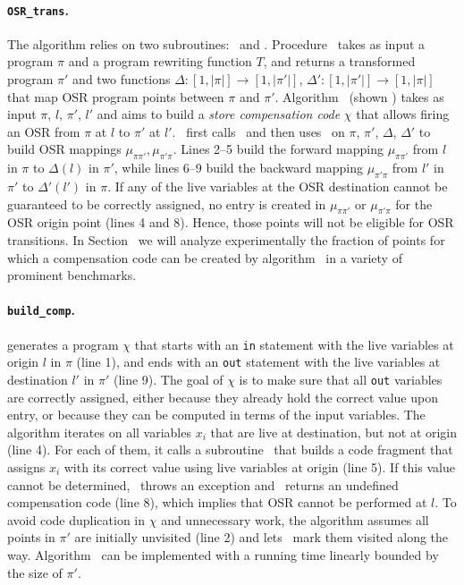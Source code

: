 \paragraph*{\texttt{OSR\_trans}.} The algorithm relies on two subroutines: \apply\ and \buildcomp. Procedure \apply\ takes as input a program $\pi$ and a program rewriting function $T$, and returns a transformed program $\pi'$ and two functions $\Delta:[1,|\pi|]\rightarrow [1,|\pi'|]$, $\Delta':[1,|\pi'|]\rightarrow [1,|\pi|]$ that map OSR program points between $\pi$ and $\pi'$. 
Algorithm \buildcomp\ (shown ) takes as input $\pi$, $l$, $\pi'$, $l'$ and aims to build a {\em store compensation code} $\chi$ that allows firing an OSR from $\pi$ at $l$ to $\pi'$ at $l'$. \osrtrans\ first calls \apply\ and then uses \buildcomp\ on $\pi$, $\pi'$, $\Delta$, $\Delta'$ to build OSR mappings $\mu_{\pi\pi'},\mu_{\pi'\pi}$. Lines 2--5 build the forward mapping $\mu_{\pi\pi'}$ from $l$ in $\pi$ to $\Delta(l)$ in $\pi'$, while lines 6--9 build the backward mapping $\mu_{\pi'\pi}$ from $l'$ in $\pi'$ to $\Delta'(l')$ in $\pi$. If any of the live variables at the OSR destination cannot be guaranteed to be correctly assigned, no entry is created in $\mu_{\pi\pi'}$ or $\mu_{\pi'\pi}$ for the OSR origin point (lines 4 and 8). Hence, those points will not be eligible for OSR transitions. In Section \missing\ we will analyze experimentally the fraction of points for which a compensation code can be created by algorithm \buildcomp\ in a variety of prominent benchmarks.

\paragraph*{\texttt{build\_comp}.}  generates a program $\chi$ that starts with an {\tt in} statement with the live variables at origin $l$ in $\pi$ (line 1), and ends with an {\tt out} statement with the live variables at destination $l'$ in $\pi'$ (line 9). The goal of $\chi$ is to make sure that all {\tt out} variables are correctly assigned, either because they already hold the correct value upon entry, or because they can be computed in terms of the input variables. The algorithm iterates on all variables $x_i$ that are live at destination, but not at origin (line 4). For each of them, it calls a subroutine \reconstruct\ that builds a code fragment that assigns $x_i$ with its correct value using live variables at origin (line 5). If this value cannot be determined, \reconstruct\ throws an exception and \buildcomp\ returns an undefined compensation code (line 8), which implies that OSR cannot be performed at $l$. To avoid code duplication in $\chi$ and unnecessary work, the algorithm assumes all points in $\pi'$ are initially unvisited (line 2) and lets \reconstruct\ mark them visited along the way. Algorithm \buildcomp\ can be implemented with a running time linearly bounded by the size of $\pi'$.

